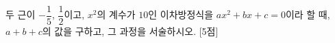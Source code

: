 두 근이 $-\dfrac{1}{5}$, $\dfrac{1}{2}$이고, $x^2$의 계수가 $10$인 이차방정식을 $ax^2+bx+c=0$이라 할 때, $a+b+c$의 값을 구하고, 그 과정을 서술하시오.  \mbox{[5점]}
